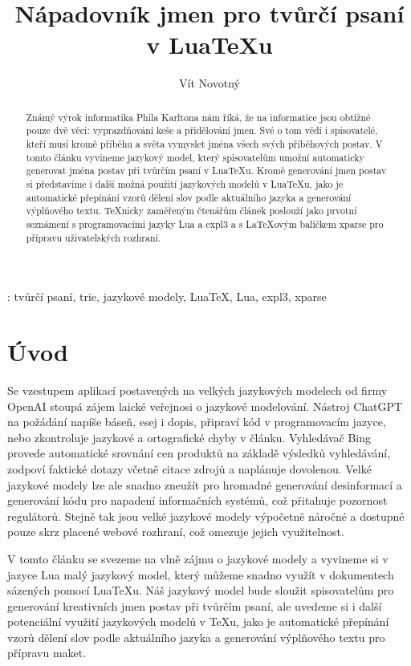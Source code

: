 \documentclass{csbulletin}
\begin{document}
\title{Nápadovník jmen pro tvůrčí psaní v Lua\TeX u}
\author{Vít Novotný}
\maketitle[1ex]

\begin{abstract}
Známý výrok informatika Phila Karltona nám říká, že na informatice jsou obtížné pouze dvě věci: vyprazdňování keše a přidělování jmen. Své o tom vědí i spisovatelé, kteří musí kromě příběhu a světa vymyslet jména všech svých příběhových postav. V tomto článku vyvineme jazykový model, který spisovatelům umožní automaticky generovat jména postav při tvůrčím psaní v Lua\TeX u. Kromě generování jmen postav si představíme i další možná použití jazykových modelů v Lua\TeX u, jako je automatické přepínání vzorů dělení slov podle aktuálního jazyka a generování výplňového textu. \TeX nicky zaměřeným čtenářům článek poslouží jako prvotní seznámení s programovacími jazyky Lua a expl3 a s \LaTeX ovým balíčkem xparse pro přípravu uživatelských rozhraní.
\end{abstract}
\klicovaslova: tvůrčí psaní, trie, jazykové modely, Lua\TeX, Lua, expl3, xparse

\section*{Úvod}

Se vzestupem aplikací postavených na velkých jazykových modelech od firmy OpenAI stoupá zájem laické veřejnosi o jazykové modelování. Nástroj ChatGPT na požádání napíše báseň, esej i dopis, připraví kód v programovacím jazyce, nebo zkontroluje jazykové a ortografické chyby v článku. Vyhledávač Bing provede automatické srovnání cen produktů na základě výsledků vyhledávání, zodpoví faktické dotazy včetně citace zdrojů a naplánuje dovolenou. Velké jazykové modely lze ale snadno zneužít pro hromadné generování desinformací a generování kódu pro napadení informačních systémů, což přitahuje pozornost regulátorů. Stejně tak jsou velké jazykové modely výpočetně náročné a dostupné pouze skrz placené webové rozhraní, což omezuje jejich využitelnost.

V tomto článku se svezeme na vlně zájmu o jazykové modely a vyvineme si v jazyce Lua malý jazykový model, který můžeme snadno využít v dokumentech sázených pomocí Lua\TeX u. Náš jazykový model bude sloužit spisovatelům pro generování kreativních jmen postav při tvůrčím psaní, ale uvedeme si i další potenciální využití jazykových modelů v \TeX u, jako je automatické přepínání vzorů dělení slov podle aktuálního jazyka a generování výplňového textu pro přípravu maket.
\end{document}
